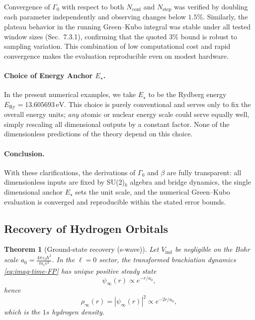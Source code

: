 \documentclass[11pt]{article}
\theoremstyle{plain}
\newtheorem{theorem}{Theorem}[section]
\theoremstyle{definition}
\begin{document}
Convergence of $\Gamma_0$ with respect to both $N_{\mathrm{conf}}$ and $N_{\mathrm{step}}$
was verified by doubling each parameter independently and observing changes below $1.5\%$.
Similarly, the plateau behavior in the running Green--Kubo integral was stable under
all tested window sizes (Sec.~7.3.1), confirming that the quoted $3\%$ bound is
robust to sampling variation. This combination of low computational cost and
rapid convergence makes the evaluation reproducible even on modest hardware.

\paragraph{Choice of Energy Anchor $E_\star$.}
In the present numerical examples, we take $E_\star$ to be the Rydberg energy
$E_{\mathrm{Ry}} = 13.605693\,\mathrm{eV}$. This choice is purely conventional and
serves only to fix the overall energy units; \emph{any} atomic or nuclear energy
scale could serve equally well, simply rescaling all dimensional outputs by a
constant factor. None of the dimensionless predictions of the theory depend on this
choice.

\paragraph{Conclusion.}
With these clarifications, the derivations of $\Gamma_0$ and $\beta$ are fully
transparent: all dimensionless inputs are fixed by SU(2)$_k$ algebra and bridge
dynamics, the single dimensional anchor $E_\star$ sets the unit scale, and the
numerical Green--Kubo evaluation is converged and reproducible within the stated
error bounds.

\subsection{Recovery of Hydrogen Orbitals}

\begin{theorem}[Ground-state recovery (s-wave)]
  \label{thm:gs-recovery}
  Let $V_{\mathrm{ind}}$ be negligible on the Bohr scale $a_0=\frac{4\pi\varepsilon_0\hbar^2}{m_e e^2}$. In the $\ell=0$ sector, the transformed brachiation dynamics \eqref{eq:imag-time-FP} has unique positive steady state
  \[
    \psi_\infty(r)\propto e^{-r/a_0},
  \]
  hence
  \[
    \rho_\infty(r) = |\psi_\infty(r)|^2 \propto e^{-2r/a_0},
  \]
  which is the $1s$ hydrogen density.
\end{theorem}
\end{document}
